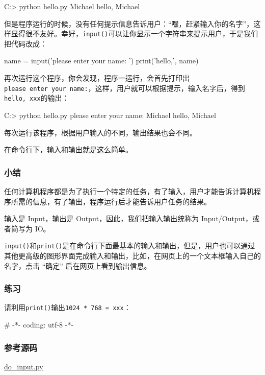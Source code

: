\begin{pythoncode}
C:\Workspace> python hello.py
Michael
hello, Michael
\end{pythoncode}

但是程序运行的时候，没有任何提示信息告诉用户：``嘿，赶紧输入你的名字''，这样显得很不友好。幸好，\texttt{input()}可以让你显示一个字符串来提示用户，于是我们把代码改成：

\begin{pythoncode}
name = input('please enter your name: ')
print('hello,', name)
\end{pythoncode}

再次运行这个程序，你会发现，程序一运行，会首先打印出\texttt{please\ enter\ your\ name:}，这样，用户就可以根据提示，输入名字后，得到\texttt{hello,\ xxx}的输出：

\begin{pythoncode}
C:\Workspace> python hello.py
please enter your name: Michael
hello, Michael
\end{pythoncode}

每次运行该程序，根据用户输入的不同，输出结果也会不同。

在命令行下，输入和输出就是这么简单。

\hypertarget{ux5c0fux7ed3}{%
\subsubsection{小结}\label{ux5c0fux7ed3}}

任何计算机程序都是为了执行一个特定的任务，有了输入，用户才能告诉计算机程序所需的信息，有了输出，程序运行后才能告诉用户任务的结果。

输入是 Input，输出是 Output，因此，我们把输入输出统称为
Input/Output，或者简写为 IO。

\texttt{input()}和\texttt{print()}是在命令行下面最基本的输入和输出，但是，用户也可以通过其他更高级的图形界面完成输入和输出，比如，在网页上的一个文本框输入自己的名字，点击
``确定'' 后在网页上看到输出信息。

\hypertarget{ux7ec3ux4e60}{%
\subsubsection{练习}\label{ux7ec3ux4e60}}

请利用\texttt{print()}输出\texttt{1024\ *\ 768\ =\ xxx}：

\begin{pythoncode}
# -*- coding: utf-8 -*-
\end{pythoncode}

\hypertarget{ux53c2ux8003ux6e90ux7801}{%
\subsubsection{参考源码}\label{ux53c2ux8003ux6e90ux7801}}

\href{https://github.com/michaelliao/learn-python3/blob/master/samples/basic/do_input.py}{do\_input.py}


